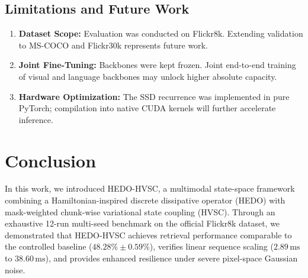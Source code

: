 \documentclass[11pt,journal,onecolumn,draftcls]{IEEEtran}
\begin{document}
\subsection{Limitations and Future Work}
\begin{enumerate}
    \item \textbf{Dataset Scope:} Evaluation was conducted on Flickr8k. Extending validation to MS-COCO \cite{lin2014microsoft} and Flickr30k \cite{young2014image} represents future work.
    \item \textbf{Joint Fine-Tuning:} Backbones were kept frozen. Joint end-to-end training of visual and language backbones may unlock higher absolute capacity.
    \item \textbf{Hardware Optimization:} The SSD recurrence was implemented in pure PyTorch; compilation into native CUDA kernels will further accelerate inference.
\end{enumerate}

\section{Conclusion}
\label{sec:conclusion}
In this work, we introduced HEDO-HVSC, a multimodal state-space framework combining a Hamiltonian-inspired discrete dissipative operator (HEDO) with mask-weighted chunk-wise variational state coupling (HVSC). Through an exhaustive 12-run multi-seed benchmark on the official Flickr8k dataset, we demonstrated that HEDO-HVSC achieves retrieval performance comparable to the controlled baseline ($48.28\% \pm 0.59\%$), verifies linear sequence scaling ($2.89\,\text{ms}$ to $38.60\,\text{ms}$), and provides enhanced resilience under severe pixel-space Gaussian noise.
\end{document}
